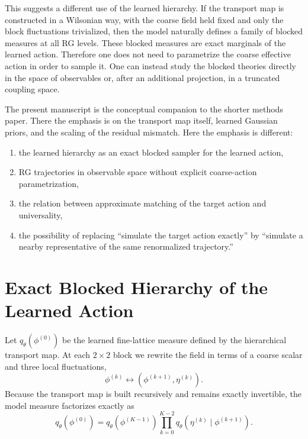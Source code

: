 \documentclass[aps,prd,reprint,nofootinbib,superscriptaddress,longbibliography]{revtex4-2}
\begin{document}
This suggests a different use of the learned hierarchy. If the transport map is
constructed in a Wilsonian way, with the coarse field held fixed and only the
block fluctuations trivialized, then the model naturally defines a family of
blocked measures at all RG levels. These blocked measures are exact marginals of
the learned action. Therefore one does not need to parametrize the coarse
effective action in order to sample it. One can instead study the blocked
theories directly in the space of observables or, after an additional
projection, in a truncated coupling space.

The present manuscript is the conceptual companion to the shorter methods paper.
There the emphasis is on the transport map itself, learned Gaussian priors, and
the scaling of the residual mismatch. Here the emphasis is different:
\begin{enumerate}
\item the learned hierarchy as an exact blocked sampler for the learned action,
\item RG trajectories in observable space without explicit coarse-action
parametrization,
\item the relation between approximate matching of the target action and
universality,
\item the possibility of replacing ``simulate the target action exactly'' by
``simulate a nearby representative of the same renormalized trajectory.''
\end{enumerate}

\section{Exact Blocked Hierarchy of the Learned Action}
\label{sec:exact_blocked_hierarchy}

Let $q_\theta(\phi^{(0)})$ be the learned fine-lattice measure defined by the
hierarchical transport map. At each $2\times2$ block we rewrite the field in
terms of a coarse scalar and three local fluctuations,
\begin{equation}
\phi^{(k)} \longleftrightarrow \left(\phi^{(k+1)},\eta^{(k)}\right).
\end{equation}
Because the transport map is built recursively and remains exactly invertible,
the model measure factorizes exactly as
\begin{equation}
q_\theta(\phi^{(0)})
=
q_\theta(\phi^{(K-1)})
\prod_{k=0}^{K-2}
q_\theta\!\left(\eta^{(k)} \mid \phi^{(k+1)}\right).
\label{eq:q_factorization}
\end{equation}
\end{document}

